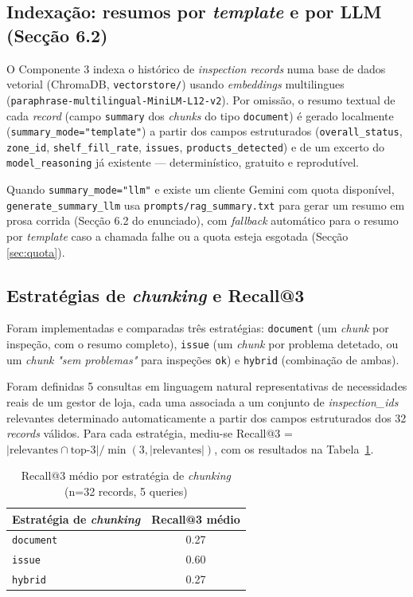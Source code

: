 \documentclass[conference]{IEEEtran}
\begin{document}
\subsection{Indexação: resumos por \textit{template} e por LLM (Secção 6.2)}

O Componente 3 indexa o histórico de \textit{inspection records} numa base
de dados vetorial (ChromaDB, \texttt{vectorstore/}) usando \textit{embeddings}
multilingues (\texttt{paraphrase-multilingual-MiniLM-L12-v2}). Por omissão,
o resumo textual de cada \textit{record} (campo \texttt{summary} dos
\textit{chunks} do tipo \texttt{document}) é gerado localmente
(\texttt{summary\_mode="template"}) a partir dos campos estruturados
(\texttt{overall\_status}, \texttt{zone\_id}, \texttt{shelf\_fill\_rate},
\texttt{issues}, \texttt{products\_detected}) e de um excerto do
\texttt{model\_reasoning} já existente --- determinístico, gratuito e
reprodutível.

Quando \texttt{summary\_mode="llm"} e existe um cliente Gemini com quota
disponível, \texttt{generate\_summary\_llm} usa
\texttt{prompts/rag\_summary.txt} para gerar um resumo em prosa corrida
(Secção 6.2 do enunciado), com \textit{fallback} automático para o resumo
por \textit{template} caso a chamada falhe ou a quota esteja esgotada
(Secção \ref{sec:quota}).

\subsection{Estratégias de \textit{chunking} e Recall@3}

Foram implementadas e comparadas três estratégias: \texttt{document} (um
\textit{chunk} por inspeção, com o resumo completo), \texttt{issue} (um
\textit{chunk} por problema detetado, ou um \textit{chunk}
\textit{"sem problemas"} para inspeções \texttt{ok}) e \texttt{hybrid}
(combinação de ambas).

Foram definidas 5 consultas em linguagem natural representativas de
necessidades reais de um gestor de loja, cada uma associada a um conjunto de
\textit{inspection\_ids} relevantes determinado automaticamente a partir dos
campos estruturados dos 32 \textit{records} válidos. Para cada estratégia,
mediu-se Recall@3 = $|\text{relevantes} \cap \text{top-3}| / \min(3,
|\text{relevantes}|)$, com os resultados na Tabela~\ref{tab:recall}.

\begin{table}[h]
\centering
\caption{Recall@3 médio por estratégia de \textit{chunking} (n=32 records, 5 queries)}
\label{tab:recall}
\begin{tabular}{lc}
\toprule
Estratégia de \textit{chunking} & Recall@3 médio \\
\midrule
\texttt{document} & 0.27 \\
\texttt{issue} & 0.60 \\
\texttt{hybrid} & 0.27 \\
\bottomrule
\end{tabular}
\end{table}
\end{document}
